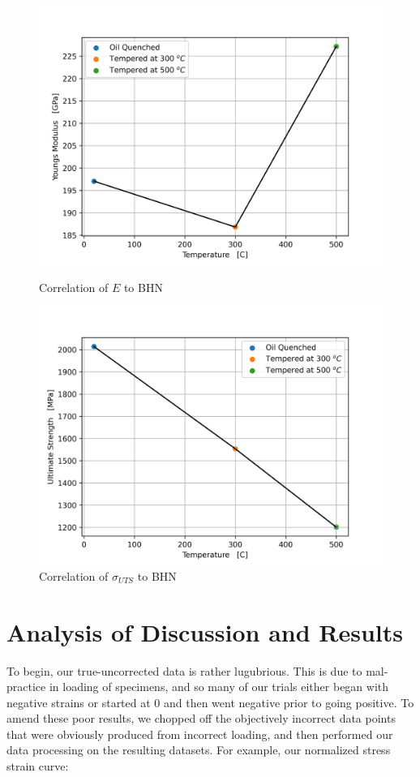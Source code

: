 \documentclass{article}
\begin{document}
\begin{figure}[!h!]
\begin{minipage}[b]{.5\linewidth}
    \includegraphics[width=\linewidth]{plots/q6_youngs.png}
    \caption{Correlation of $E$ to BHN}
    \label{fig:q6-youngs}
    \vspace{4ex}
\end{minipage}
\begin{minipage}[b]{.5\linewidth}
    \includegraphics[width=\linewidth]{plots/q6_uts.png}
    \caption{Correlation of $\sigma_{UTS}$ to BHN}
    \label{fig:q6-uts}
    \vspace{4ex}
\end{minipage}
\end{figure}
\newpage

\section{Analysis of Discussion and Results}
To begin, our true-uncorrected data is rather lugubrious. This is due to mal-practice in loading of specimens, and so many of our trials either began with negative strains or started at 0 and then went negative prior to going positive. To amend these poor results, we chopped off the objectively incorrect data points that were obviously produced from incorrect loading, and then performed our data processing on the resulting datasets. For example, our normalized stress strain curve:
\end{document}
